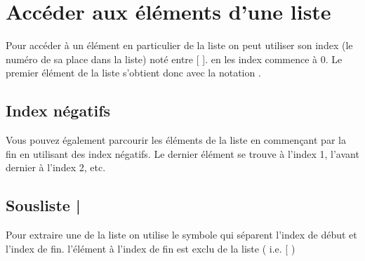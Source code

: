 \documentclass[letterpaper,10pt,english]{sphinxmanual}
\begin{document}
\section{Accéder aux éléments d’une liste}
\label{\detokenize{src/OCI02_Listes:acceder-aux-elements-d-une-liste}}
Pour accéder à un élément en particulier de la liste on peut utiliser son index (le numéro de sa place dans la liste) noté entre {[} {]}. en  les index commence à 0. Le premier élément de la liste s’obtient donc avec la notation .

\begin{sphinxVerbatim}[commandchars=\\\{\}]
 \PYG{p}{[}\PYG{p}{]} 
\end{sphinxVerbatim}


\subsection{Index négatifs}
\label{\detokenize{src/OCI02_Listes:index-negatifs}}
Vous pouvez également parcourir les éléments de la liste en commençant par la fin en utilisant des index négatifs.
Le dernier élément se trouve à l’index \sphinxhyphen{}1, l’avant dernier à l’index \sphinxhyphen{}2, etc.

\begin{sphinxVerbatim}[commandchars=\\\{\}]
  \PYG{p}{[} \PYG{p}{[}\PYG{p}{]} \PYG{p}{[}\PYG{p}{]} \PYG{p}{]}
\end{sphinxVerbatim}


\subsection{Sous\sphinxhyphen{}liste | }
\label{\detokenize{src/OCI02_Listes:sous-liste-slicing}}
Pour extraire une  de la liste on utilise le symbole \sphinxstylestrong{:} qui séparent l’index de début et l’index de fin. l’élément à l’index de fin est exclu de la liste ( i.e. {[}\sphinxstyleemphasis{index\_début ; index\_fin}{[} )

\begin{sphinxVerbatim}[commandchars=\\\{\}]
\PYG{p}{[}\PYG{p}{]}
\end{sphinxVerbatim}
\end{document}
